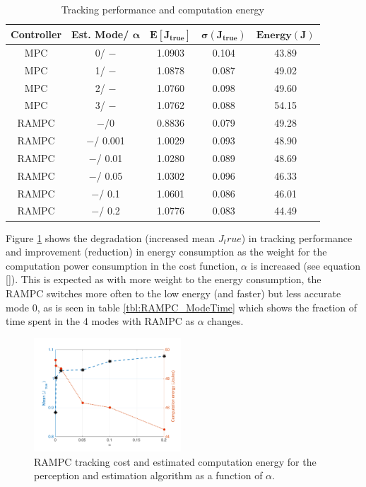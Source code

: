 \begin{table}[htb]
\begin{center}
\caption{Tracking performance and computation energy}
\label{tbl:RAMPC_MPC_performance}
\begin{tabular} {|c|c|c|c|c|}
	\hline
	\textbf{Controller} &\textbf{Est. Mode}/ $\pmb{\alpha}$ & $\pmb{E[J_{true}]}$ & $\pmb{\sigma({J_{true}})}$ & $\pmb{Energy(J)}$ \\ \hline
	MPC & 0/ $-$ & 1.0903 & 0.104 & 43.89\\ \hline
	MPC & 1/ $-$ & 1.0878 & 0.087 & 49.02 \\ \hline
	MPC & 2/ $-$ & 1.0760 & 0.098 & 49.60 \\ \hline
	MPC & 3/ $-$ & 1.0762 & 0.088 & 54.15 \\ \hline
	RAMPC &  $-$/0 & 0.8836 & 0.079 & 49.28 \\ \hline
	RAMPC & $-$/ 0.001 & 1.0029 & 0.093 & 48.90  \\ \hline
	RAMPC & $-$/ 0.01 & 1.0280 & 0.089 & 48.69  \\ \hline
	RAMPC & $-$/ 0.05 &1.0302 & 0.096 & 46.33 \\ \hline
	RAMPC & $-$/ 0.1 &1.0601 & 0.086 & 46.01 \\ \hline
	RAMPC & $-$/ 0.2 & 1.0776 & 0.083 & 44.49 \\ \hline
\end{tabular}	
	\end{center}
\end{table}



Figure \ref{fig:CostAndEnergyVsAlpha} shows the degradation (increased mean $J_true$) in tracking performance and improvement (reduction) in energy consumption as the weight for the computation power consumption in the cost function, $\alpha$ is increased (see equation \ref{}). This is expected as with more weight to the energy consumption, the RAMPC switches more often to the low energy (and faster) but less accurate mode 0, as is seen in table \ref{tbl:RAMPC_ModeTime} which shows the fraction of time spent in the 4 modes with RAMPC as $\alpha$ changes.


\begin{figure}[t]
	\centering
	\includegraphics[width=0.49\textwidth,scale=0.7]{figures/CostAndEnergyVsAlpha}
        \vspace{-20pt}
	\caption{RAMPC tracking cost and estimated computation energy for the perception and estimation algorithm as a function of $\alpha$. }
	\label{fig:CostAndEnergyVsAlpha}
\end{figure}


